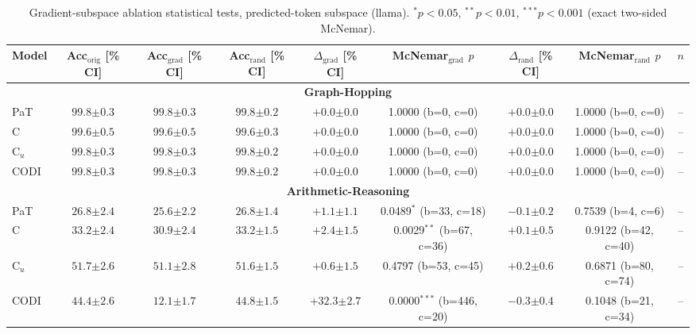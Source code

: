 \begin{table}[h!]
\centering
\small
\setlength{\tabcolsep}{3pt}
\begin{tabular}{l ccc cc cc c}
\toprule
Model & Acc$_{\text{orig}}$ [\% CI] & Acc$_{\text{grad}}$ [\% CI] & Acc$_{\text{rand}}$ [\% CI] & $\Delta_{\text{grad}}$ [\% CI] & McNemar$_{\text{grad}}$ $p$ & $\Delta_{\text{rand}}$ [\% CI] & McNemar$_{\text{rand}}$ $p$ & $n$ \\
\midrule
\multicolumn{9}{c}{\textbf{Graph-Hopping}} \\
\midrule
PaT & $99.8 {\scriptstyle \pm 0.3}$ & $99.8 {\scriptstyle \pm 0.3}$ & $99.8 {\scriptstyle \pm 0.2}$ & $+0.0 {\scriptstyle \pm 0.0}$ & 1.0000 (b=0, c=0) & $+0.0 {\scriptstyle \pm 0.0}$ & 1.0000 (b=0, c=0) & -- \\
C & $99.6 {\scriptstyle \pm 0.5}$ & $99.6 {\scriptstyle \pm 0.5}$ & $99.6 {\scriptstyle \pm 0.3}$ & $+0.0 {\scriptstyle \pm 0.0}$ & 1.0000 (b=0, c=0) & $+0.0 {\scriptstyle \pm 0.0}$ & 1.0000 (b=0, c=0) & -- \\
C$_u$ & $99.8 {\scriptstyle \pm 0.3}$ & $99.8 {\scriptstyle \pm 0.3}$ & $99.8 {\scriptstyle \pm 0.2}$ & $+0.0 {\scriptstyle \pm 0.0}$ & 1.0000 (b=0, c=0) & $+0.0 {\scriptstyle \pm 0.0}$ & 1.0000 (b=0, c=0) & -- \\
CODI & $99.8 {\scriptstyle \pm 0.3}$ & $99.8 {\scriptstyle \pm 0.3}$ & $99.8 {\scriptstyle \pm 0.2}$ & $+0.0 {\scriptstyle \pm 0.0}$ & 1.0000 (b=0, c=0) & $+0.0 {\scriptstyle \pm 0.0}$ & 1.0000 (b=0, c=0) & -- \\
\midrule
\multicolumn{9}{c}{\textbf{Arithmetic-Reasoning}} \\
\midrule
PaT & $26.8 {\scriptstyle \pm 2.4}$ & $25.6 {\scriptstyle \pm 2.2}$ & $26.8 {\scriptstyle \pm 1.4}$ & $+1.1 {\scriptstyle \pm 1.1}$ & 0.0489$^{*}$ (b=33, c=18) & $-0.1 {\scriptstyle \pm 0.2}$ & 0.7539 (b=4, c=6) & -- \\
C & $33.2 {\scriptstyle \pm 2.4}$ & $30.9 {\scriptstyle \pm 2.4}$ & $33.2 {\scriptstyle \pm 1.5}$ & $+2.4 {\scriptstyle \pm 1.5}$ & 0.0029$^{**}$ (b=67, c=36) & $+0.1 {\scriptstyle \pm 0.5}$ & 0.9122 (b=42, c=40) & -- \\
C$_u$ & $51.7 {\scriptstyle \pm 2.6}$ & $51.1 {\scriptstyle \pm 2.8}$ & $51.6 {\scriptstyle \pm 1.5}$ & $+0.6 {\scriptstyle \pm 1.5}$ & 0.4797 (b=53, c=45) & $+0.2 {\scriptstyle \pm 0.6}$ & 0.6871 (b=80, c=74) & -- \\
CODI & $44.4 {\scriptstyle \pm 2.6}$ & $12.1 {\scriptstyle \pm 1.7}$ & $44.8 {\scriptstyle \pm 1.5}$ & $+32.3 {\scriptstyle \pm 2.7}$ & 0.0000$^{***}$ (b=446, c=20) & $-0.3 {\scriptstyle \pm 0.4}$ & 0.1048 (b=21, c=34) & -- \\
\bottomrule
\end{tabular}
\caption{Gradient-subspace ablation statistical tests, predicted-token subspace (llama). $^{*}p{<}0.05$, $^{**}p{<}0.01$, $^{***}p{<}0.001$ (exact two-sided McNemar).}
\label{tab:gradsubspace_predtoken_ablation_stats_llama}
\end{table}

